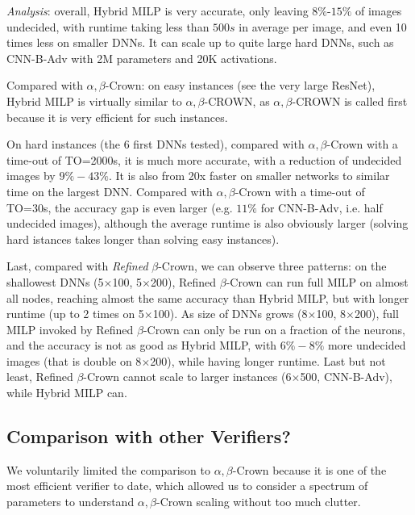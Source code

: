 {\em Analysis}: overall, Hybrid MILP is very accurate, only leaving $8\%$-$15\%$ of images undecided, with runtime taking less than $500s$ in average per image, and even 10 times less on smaller DNNs. It can scale up to quite large hard DNNs, such as CNN-B-Adv with 2M parameters and 20K activations.

Compared with $\alpha,\beta$-Crown:
on easy instances (see the very large ResNet), Hybrid MILP is virtually similar to $\alpha,\beta$-CROWN, as $\alpha,\beta$-CROWN is called first because it is very efficient for such instances.

On hard instances (the 6 first DNNs tested), compared with $\alpha,\beta$-Crown with a time-out of TO=2000s, it is much more accurate, with a reduction of undecided images by $9\%-43\%$. It is also from 20x faster on smaller networks to similar time on the largest DNN.
Compared with $\alpha,\beta$-Crown with a time-out of TO=30s, the accuracy gap is even larger (e.g. $11\%$ for CNN-B-Adv, i.e. half undecided images), although the average runtime is also obviously larger (solving hard istances takes longer than solving easy instances).

Last, compared with {\em Refined} $\beta$-Crown, we can observe three patterns: on the shallowest DNNs (5$\times$100, 5$\times$200), Refined $\beta$-Crown can run full MILP on almost all nodes, reaching almost the same accuracy than  Hybrid MILP, but with longer runtime (up to 2 times on 5$\times$100). As size of DNNs grows (8$\times$100, 8$\times$200), full MILP invoked by Refined $\beta$-Crown can only be run on a fraction of the neurons, and the accuracy is not as good as Hybrid MILP, with $6\%-8\%$ more undecided images (that is double on 8$\times$200), while having longer runtime. Last but not least, Refined $\beta$-Crown cannot scale to larger instances (6$\times$500, CNN-B-Adv), while Hybrid MILP can.





\subsection{Comparison with other Verifiers?}

We voluntarily limited the comparison to $\alpha,\beta$-Crown because it is one of the most efficient verifier to date, which allowed us to consider a spectrum of parameters to understand $\alpha,\beta$-Crown scaling without too much clutter.

